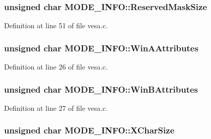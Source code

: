 \subsubsection[{\texorpdfstring{Reserved\+Mask\+Size}{ReservedMaskSize}}]{\setlength{\rightskip}{0pt plus 5cm}unsigned char M\+O\+D\+E\+\_\+\+I\+N\+F\+O\+::\+Reserved\+Mask\+Size}\hypertarget{structMODE__INFO_a476c52eecf02936bc170809f375bde05}{}\label{structMODE__INFO_a476c52eecf02936bc170809f375bde05}


Definition at line 51 of file vesa.\+c.

\subsubsection[{\texorpdfstring{Win\+A\+Attributes}{WinAAttributes}}]{\setlength{\rightskip}{0pt plus 5cm}unsigned char M\+O\+D\+E\+\_\+\+I\+N\+F\+O\+::\+Win\+A\+Attributes}\hypertarget{structMODE__INFO_a13c07e34a389abb77442dc491768dac1}{}\label{structMODE__INFO_a13c07e34a389abb77442dc491768dac1}


Definition at line 26 of file vesa.\+c.

\subsubsection[{\texorpdfstring{Win\+B\+Attributes}{WinBAttributes}}]{\setlength{\rightskip}{0pt plus 5cm}unsigned char M\+O\+D\+E\+\_\+\+I\+N\+F\+O\+::\+Win\+B\+Attributes}\hypertarget{structMODE__INFO_aecd320d96b1d3c1a7d8f09bf53e58412}{}\label{structMODE__INFO_aecd320d96b1d3c1a7d8f09bf53e58412}


Definition at line 27 of file vesa.\+c.

\subsubsection[{\texorpdfstring{X\+Char\+Size}{XCharSize}}]{\setlength{\rightskip}{0pt plus 5cm}unsigned char M\+O\+D\+E\+\_\+\+I\+N\+F\+O\+::\+X\+Char\+Size}\hypertarget{structMODE__INFO_ace02de2544b40e5c83f7e9fbebd418cc}{}\label{structMODE__INFO_ace02de2544b40e5c83f7e9fbebd418cc}


